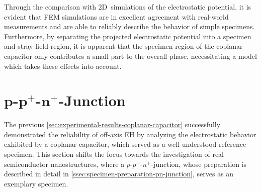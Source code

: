 Through the comparison with 2D~simulations of the electrostatic potential, it is evident that FEM simulations are in excellent agreement with real-world measurements and are able to reliably describe the behavior of simple specimens. Furthermore, by separating the projected electrostatic potential into a specimen and stray field region, it is apparent that the specimen region of the coplanar capacitor only contributes a small part to the overall phase, necessitating a model which takes these effects into account.
\section[\texorpdfstring{$p$-$p^+$-$n^+$}{\textit{p}-\textit{p}\textsuperscript{+}-\textit{n}\textsuperscript{+}}-Junction]{$\boldsymbol{p}$-$\boldsymbol{p^+}$-$\boldsymbol{n^+}$-Junction}
The previous \cref{sec:experimental-results-coplanar-capacitor} successfully demonstrated the reliability of off-axis EH by analyzing the electrostatic behavior exhibited by a coplanar capacitor, which served as a well-understood reference specimen. This section shifts the focus towards the investigation of real semiconductor nanostructures, where a $p$-$p^+$-$n^+$-junction, whose preparation is described in detail in \cref{ssec:specimen-preparation-pn-junction}, serves as an exemplary specimen.
